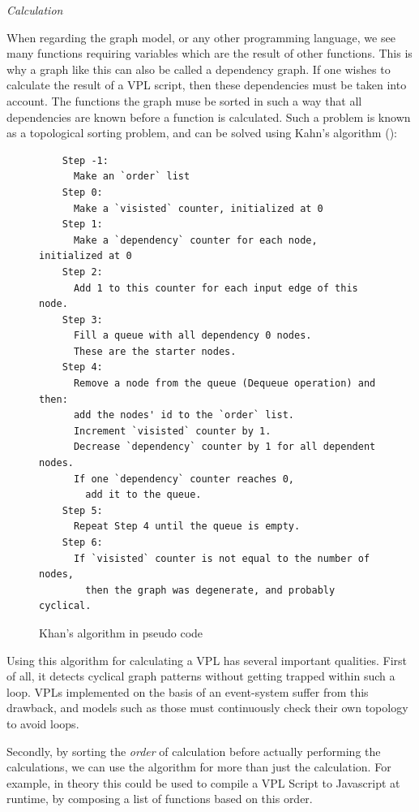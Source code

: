 \emph{Calculation}

When regarding the graph model, or any other programming language, we see many functions requiring variables which are the result of other functions. 
This is why a graph like this can also be called a dependency graph. 
If one wishes to calculate the result of a VPL script, then these dependencies must be taken into account. 
The functions the graph muse be sorted in such a way that all dependencies are known before a function is calculated.
Such a problem is known as a topological sorting problem, and can be solved using Kahn's algorithm (): 

\begin{figure}
  \centering
  \begin{lstlisting}
    Step -1: 
      Make an `order` list
    Step 0: 
      Make a `visisted` counter, initialized at 0
    Step 1: 
      Make a `dependency` counter for each node, initialized at 0
    Step 2: 
      Add 1 to this counter for each input edge of this node.
    Step 3: 
      Fill a queue with all dependency 0 nodes. 
      These are the starter nodes.
    Step 4: 
      Remove a node from the queue (Dequeue operation) and then:
      add the nodes' id to the `order` list.
      Increment `visisted` counter by 1.
      Decrease `dependency` counter by 1 for all dependent nodes.
      If one `dependency` counter reaches 0, 
        add it to the queue.
    Step 5: 
      Repeat Step 4 until the queue is empty.
    Step 6: 
      If `visisted` counter is not equal to the number of nodes, 
        then the graph was degenerate, and probably cyclical. 
    \end{lstlisting}
  \caption[Kahns algorithm]{Khan's algorithm in pseudo code}
  \label{fig:kahn}
\end{figure}

Using this algorithm for calculating a VPL has several important qualities. 
First of all, it detects cyclical graph patterns without getting trapped within such a loop. 
VPLs implemented on the basis of an event-system suffer from this drawback, and models such as those must continuously check their own topology to avoid loops. 

Secondly, by sorting the \emph{order} of calculation before actually performing the calculations, we can use the algorithm for more than just the calculation.
For example, in theory this could be used to compile a VPL Script to Javascript at runtime, by composing a list of functions based on this order. 


